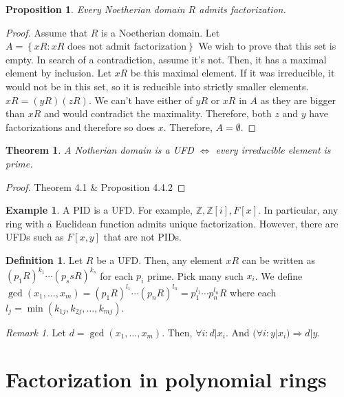 \documentclass{article}
\newcommand\Z{\ensuremath{\mathbb{Z}}}
\renewcommand\O{\ensuremath{\emptyset}}
\newtheorem{theorem}{Theorem}[section]
\theoremstyle{definition}
\newtheorem{definition}{Definition}[subsection]
\newtheorem{eg}{Example}[subsection]
\theoremstyle{remark}
\newtheorem*{remark}{Remark}
\theoremstyle{plain}
\newtheorem{prop}{Proposition}[subsection]
\begin{document}
\begin{prop}
    Every Noetherian domain \(R\) admits factorization. 
\end{prop}
\begin{proof}
    Assume that \(R\) is a Noetherian domain. Let \(A = \left\{ xR: xR \text{ does not admit factorization} \right\}\)
    We wish to prove that this set is empty. In search of a contradiction, assume it's not. Then, it has a maximal element
    by inclusion. Let \(xR\) be this maximal element. If it was irreducible, it would not be in this set, so it is reducible into 
    strictly smaller elements. \(xR = (yR)(zR)\). We can't have either of \(yR\) or \(xR\) in \(A\) as they are bigger than \(xR\)
    and would contradict the maximality. Therefore, both \(z\) and \(y\) have factorizations and therefore so does \(x\). Therefore, 
    \(A = \O\).

\end{proof}

\begin{theorem}
    A Notherian domain is a UFD \(\iff\) every irreducible element is prime.
\end{theorem}
\begin{proof}
    Theorem 4.1 \& Proposition 4.4.2
\end{proof}

\begin{eg}
    A PID is a UFD. For example, \(\Z, \Z[i], F[x]\). In particular, any ring with a Euclidean function 
    admits unique factorization. However, there are UFDs such as \(F[x,y]\) that are not PIDs.
\end{eg}

\begin{definition}
    Let \(R\) be a UFD. Then, any element \(xR\) can be written as \((p_1R)^{k_1}\cdots(p_ssR)^{k_s}\) for each \(p_i\) prime. 
    Pick many such \(x_i\). We define \(\gcd(x_1, \ldots, x_m) = (p_1R)^{l_1}\cdots(p_nR)^{l_n} = p_1^{l_1}\cdots p_n^{l_n}R\) where each \(l_j = \min(k_{1j},
    k_{2j}, \ldots, k_{mj})\).
\end{definition}

\begin{remark}
    Let \(d = \gcd(x_1, \ldots, x_m)\). Then, \(\forall i: d|x_i\). And \((\forall i: y|x_i) \Rightarrow d|y\).
\end{remark}


\section{Factorization in polynomial rings}
\end{document}

